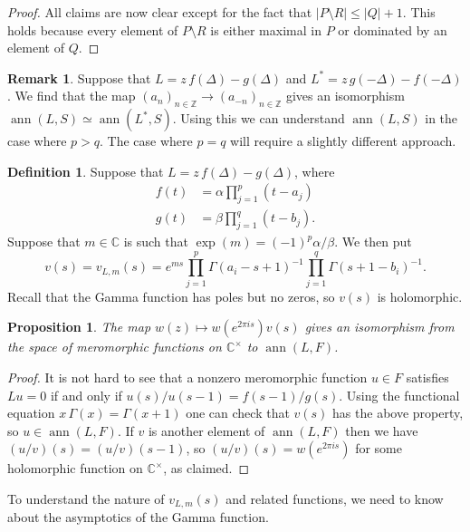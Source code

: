 \documentclass{amsart}
\newcommand{\ann}       {\operatorname{ann}}
\newcommand{\Z}         {{\mathbb{Z}}}
\newcommand{\C}         {{\mathbb{C}}}
\newcommand{\al}        {\alpha}
\newcommand{\bt}        {\beta}
\newcommand{\Gm}        {\Gamma}
\newcommand{\Dl}        {\Delta}
\newcommand{\sm}        {\setminus}
\newcommand{\tm}        {\times}
\renewcommand{\:}{\colon}
\newtheorem{proposition}[theorem]{Proposition}
\theoremstyle{definition}
\newtheorem{remark}[theorem]{Remark}
\newtheorem{definition}[theorem]{Definition}
\begin{document}
\begin{proof}
 All claims are now clear except for the fact that
 $|P\sm R|\leq |Q|+1$.  This holds because every element of $P\sm R$
 is either maximal in $P$ or dominated by an element of $Q$.  
\end{proof}

\begin{remark}
 Suppose that $L=z\,f(\Dl)-g(\Dl)$ and $L^*=z\,g(-\Dl)-f(-\Dl)$.  We
 find that the map $(a_n)_{n\in\Z}\to (a_{-n})_{n\in\Z}$ gives an
 isomorphism $\ann(L,S)\simeq\ann(L^*,S)$.  Using this we can
 understand $\ann(L,S)$ in the case where $p>q$.  The case where $p=q$
 will require a slightly different approach.
\end{remark}

\begin{definition}
 Suppose that $L=z\,f(\Dl)-g(\Dl)$, where 
 \begin{align*}
  f(t) &= \al\prod_{j=1}^p(t-a_j) \\
  g(t) &= \bt\prod_{j=1}^q(t-b_j).
 \end{align*}
 Suppose that $m\in\C$ is such that $\exp(m)=(-1)^p\al/\bt$.  We then
 put 
 \[ v(s) = v_{L,m}(s) =
    e^{ms} \prod_{j=1}^p\Gm(a_i-s+1)^{-1} 
           \prod_{j=1}^q\Gm(s+1-b_i)^{-1}.
 \]
 Recall that the Gamma function has poles but no zeros, so $v(s)$ is
 holomorphic.  
\end{definition}

\begin{proposition}
 The map $w(z)\mapsto w(e^{2\pi i s})v(s)$ gives an isomorphism from
 the space of meromorphic functions on $\C^\tm$ to $\ann(L,F)$.
\end{proposition}
\begin{proof}
 It is not hard to see that a nonzero meromorphic function $u\in F$
 satisfies $Lu=0$ if and only if $u(s)/u(s-1)=f(s-1)/g(s)$.  Using the
 functional equation $x\,\Gm(x)=\Gm(x+1)$ one can check that $v(s)$
 has the above property, so $u\in\ann(L,F)$.  If $v$ is another
 element of $\ann(L,F)$ then we have $(u/v)(s)=(u/v)(s-1)$, so
 $(u/v)(s)=w(e^{2\pi is})$ for some holomorphic function on $\C^\tm$,
 as claimed.
\end{proof}

To understand the nature of $v_{L,m}(s)$ and related functions, we
need to know about the asymptotics of the Gamma function.  

\begin{bibdiv}
\begin{biblist}
\end{biblist}
\end{bibdiv}
\end{document}
